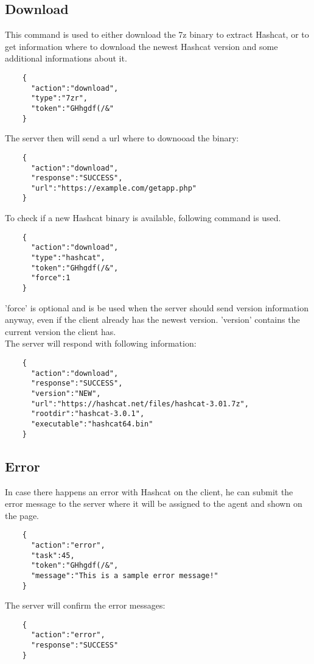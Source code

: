 \documentclass{article}
\begin{document}
	\subsection*{Download}
	This command is used to either download the 7z binary to extract Hashcat, or to get information where to download the newest Hashcat version and some additional informations about it.
	\begin{verbatim}
	{
	  "action":"download",
	  "type":"7zr",
	  "token":"GHhgdf(/&"
	}
	\end{verbatim}
	The server then will send a url where to downooad the binary:
	\begin{verbatim}
	{
	  "action":"download",
	  "response":"SUCCESS",
	  "url":"https://example.com/getapp.php"
	}
	\end{verbatim}
	To check if a new Hashcat binary is available, following command is used.
	\begin{verbatim}
	{
	  "action":"download",
	  "type":"hashcat",
	  "token":"GHhgdf(/&",
	  "force":1
	}
	\end{verbatim}
	'force' is optional and is be used when the server should send version information anyway, even if the client already has the newest version. 'version' contains the current version the client has.\\
	The server will respond with following information:
	\begin{verbatim}
	{
	  "action":"download",
	  "response":"SUCCESS",
	  "version":"NEW",
	  "url":"https://hashcat.net/files/hashcat-3.01.7z",
	  "rootdir":"hashcat-3.0.1",
	  "executable":"hashcat64.bin"
	}
	\end{verbatim}
	
	\subsection*{Error}
	In case there happens an error with Hashcat on the client, he can submit the error message to the server where it will be assigned to the agent and shown on the page.
	\begin{verbatim}
	{
	  "action":"error",
	  "task":45,
	  "token":"GHhgdf(/&",
	  "message":"This is a sample error message!"
	}
	\end{verbatim}
	The server will confirm the error messages:
	\begin{verbatim}
	{
	  "action":"error",
	  "response":"SUCCESS"
	}
	\end{verbatim}
	
\end{document}
